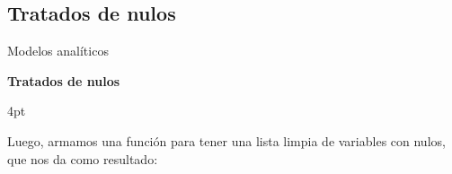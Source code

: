 \documentclass[pdf]{beamer}
\def\\{}%
\def\vspace{}%
\begin{document}
{%

    \subsection{Tratados de nulos}

\begin{frame}{Modelos analíticos}

    \begin{Large}
        \textbf{Tratados de nulos}
    \end{Large}
    \vspace{4pt}

    Luego, armamos una función para tener una lista limpia de variables con nulos, que nos da como resultado:


\end{frame}}
\end{document}
